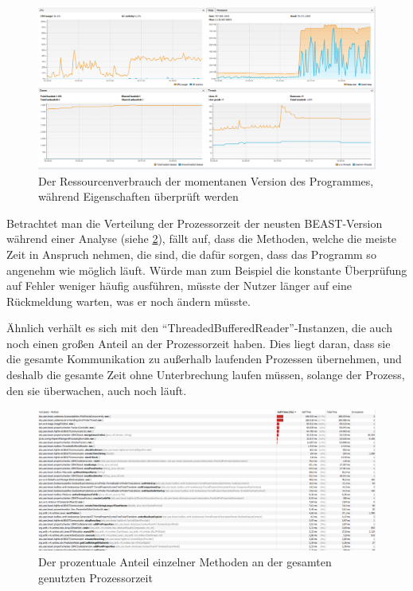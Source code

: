 \documentclass[a4paper]{scrreprt}
\begin{document}
\vspace{4cm}

\begin{figure}[ht]
	\centering
  \includegraphics[width=1.0\textwidth,
  height=0.40\textwidth]{images/NEW_YES.png} \caption{Der Ressourcenverbrauch der
  momentanen Version des Programmes, während Eigenschaften überprüft werden}
	\label{fig4}
\end{figure}

\newpage
Betrachtet man die Verteilung der Prozessorzeit der neusten BEAST-Version während einer
Analyse (siehe \ref{fig5}), fällt auf, dass die Methoden, welche die meiste
Zeit in Anspruch nehmen, die sind, die dafür sorgen, dass das Programm
so angenehm wie möglich läuft. Würde man zum Beispiel die konstante
Überprüfung auf Fehler weniger häufig ausführen, müsste der Nutzer länger auf eine
Rückmeldung warten, was er noch ändern müsste. 

Ähnlich verhält es sich mit den
"`ThreadedBufferedReader"'-Instanzen, die auch noch einen großen Anteil an der
Prozessorzeit haben. Dies liegt daran, dass sie die gesamte Kommunikation zu
außerhalb laufenden Prozessen übernehmen, und deshalb die gesamte Zeit ohne
Unterbrechung laufen müssen, solange der Prozess, den sie überwachen, auch noch
läuft.

\begin{figure}[ht]
	\centering
  \includegraphics[width=1.0\textwidth,
  height=0.40\textwidth]{images/BEAST_PROCESSORTIME.png} \caption{Der
  prozentuale Anteil einzelner Methoden an der gesamten genutzten Prozessorzeit}
	\label{fig5}
\end{figure}
\end{document}
